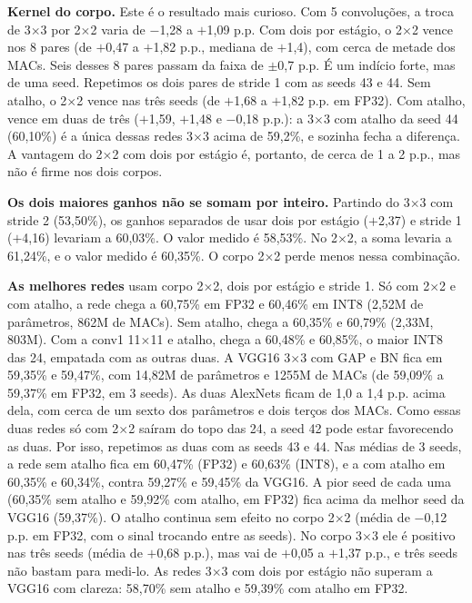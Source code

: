 \documentclass[conference]{IEEEtran}
\newcommand{\by}{\ensuremath{\times}}
\begin{document}
\textbf{Kernel do corpo.} Este é o resultado mais curioso. Com 5 convoluções, a troca de 3\by3 por 2\by2 varia de $-$1,28 a $+$1,09 p.p. Com dois por estágio, o 2\by2 vence nos 8 pares (de $+$0,47 a $+$1,82 p.p., mediana de $+$1,4), com cerca de metade dos MACs. Seis desses 8 pares passam da faixa de $\pm$0,7 p.p. É um indício forte, mas de uma seed. Repetimos os dois pares de stride 1 com as seeds 43 e 44. Sem atalho, o 2\by2 vence nas três seeds (de $+$1,68 a $+$1,82 p.p. em FP32). Com atalho, vence em duas de três ($+$1,59, $+$1,48 e $-$0,18 p.p.): a 3\by3 com atalho da seed 44 (60,10\%) é a única dessas redes 3\by3 acima de 59,2\%, e sozinha fecha a diferença. A vantagem do 2\by2 com dois por estágio é, portanto, de cerca de 1 a 2 p.p., mas não é firme nos dois corpos.

\textbf{Os dois maiores ganhos não se somam por inteiro.} Partindo do 3\by3 com stride 2 (53,50\%), os ganhos separados de usar dois por estágio ($+$2,37) e stride 1 ($+$4,16) levariam a 60,03\%. O valor medido é 58,53\%. No 2\by2, a soma levaria a 61,24\%, e o valor medido é 60,35\%. O corpo 2\by2 perde menos nessa combinação.

\textbf{As melhores redes} usam corpo 2\by2, dois por estágio e stride 1. Só com 2\by2 e com atalho, a rede chega a 60,75\% em FP32 e 60,46\% em INT8 (2,52M de parâmetros, 862M de MACs). Sem atalho, chega a 60,35\% e 60,79\% (2,33M, 803M). Com a conv1 11\by11 e atalho, chega a 60,48\% e 60,85\%, o maior INT8 das 24, empatada com as outras duas. A VGG16 3\by3 com GAP e BN fica em 59,35\% e 59,47\%, com 14,82M de parâmetros e 1255M de MACs (de 59,09\% a 59,37\% em FP32, em 3 seeds). As duas AlexNets ficam
de 1,0 a 1,4 p.p. acima dela, com cerca de um sexto dos parâmetros e dois terços dos MACs. Como essas duas redes só com 2\by2 saíram do topo das 24, a seed 42 pode estar favorecendo as duas. Por isso, repetimos as duas com as seeds 43 e 44. Nas médias de 3 seeds, a rede sem atalho fica em 60,47\% (FP32) e 60,63\% (INT8), e a com atalho em 60,35\% e 60,34\%, contra 59,27\% e 59,45\% da VGG16. A pior seed de cada uma (60,35\% sem atalho e 59,92\% com atalho, em FP32) fica acima da melhor seed da VGG16 (59,37\%). O atalho continua sem efeito no corpo 2\by2 (média de $-$0,12 p.p. em FP32, com o sinal trocando entre as seeds). No corpo 3\by3 ele é positivo nas três seeds (média de $+$0,68 p.p.), mas vai de $+$0,05 a $+$1,37 p.p., e três seeds não bastam para medi-lo. As redes 3\by3 com dois por estágio não superam a VGG16 com clareza: 58,70\% sem atalho e 59,39\% com atalho em FP32.
\end{document}
